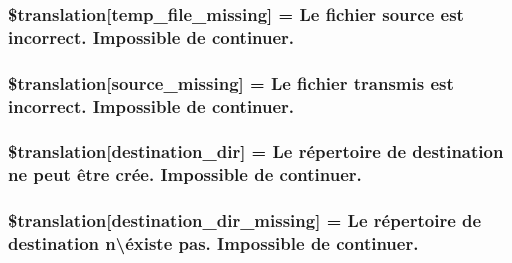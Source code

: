 \subsubsection[{\$translation}]{\setlength{\rightskip}{0pt plus 5cm}\$translation\mbox{[}\textquotesingle{}temp\+\_\+file\+\_\+missing\textquotesingle{}\mbox{]} = \textquotesingle{}Le fichier source est incorrect. Impossible de continuer.\textquotesingle{}}\label{class_8upload_8fr___f_r_8php_ab0fa87a88aba2624004581eed0633325}
\hypertarget{class_8upload_8fr___f_r_8php_aceaaf7355acaaf10f0ae60378d03c468}{}
\subsubsection[{\$translation}]{\setlength{\rightskip}{0pt plus 5cm}\$translation\mbox{[}\textquotesingle{}source\+\_\+missing\textquotesingle{}\mbox{]} = \textquotesingle{}Le fichier transmis est incorrect. Impossible de continuer.\textquotesingle{}}\label{class_8upload_8fr___f_r_8php_aceaaf7355acaaf10f0ae60378d03c468}
\hypertarget{class_8upload_8fr___f_r_8php_aff2427c72a2598aefa6d58df1dd18b08}{}
\subsubsection[{\$translation}]{\setlength{\rightskip}{0pt plus 5cm}\$translation\mbox{[}\textquotesingle{}destination\+\_\+dir\textquotesingle{}\mbox{]} = \textquotesingle{}Le répertoire de destination ne peut être crée. Impossible de continuer.\textquotesingle{}}\label{class_8upload_8fr___f_r_8php_aff2427c72a2598aefa6d58df1dd18b08}
\hypertarget{class_8upload_8fr___f_r_8php_a9ef28d3cf09942c6c0a1e77fa09185e8}{}
\subsubsection[{\$translation}]{\setlength{\rightskip}{0pt plus 5cm}\$translation\mbox{[}\textquotesingle{}destination\+\_\+dir\+\_\+missing\textquotesingle{}\mbox{]} = \textquotesingle{}Le répertoire de destination n\textbackslash{}\textquotesingle{}éxiste pas. Impossible de continuer.\textquotesingle{}}\label{class_8upload_8fr___f_r_8php_a9ef28d3cf09942c6c0a1e77fa09185e8}
\hypertarget{class_8upload_8fr___f_r_8php_a5704a67137126e8c87b7a364175929d4}{}
